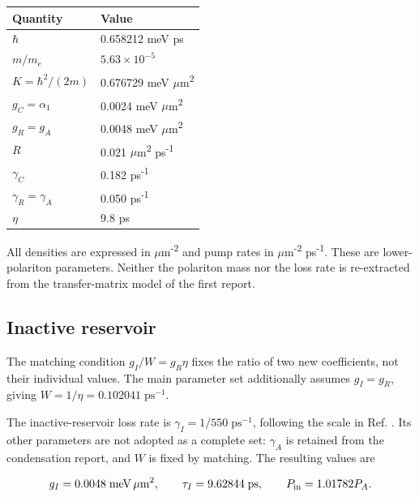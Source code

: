 \documentclass[12pt,a4paper]{article}
\begin{document}
\begingroup\small\setlength{\tabcolsep}{5pt}\renewcommand{\arraystretch}{1.2}
\begin{longtable}{@{}p{}p{}@{}}
\toprule
Quantity & Value\\
\midrule
\(\hbar\) & 0.658212 meV ps\\
\(m/m_e\) & \(5.63\times10^{-5}\)\\
\(K=\hbar^2/(2m)\) & 0.676729 meV \ensuremath{\mu}m\textsuperscript{2}\\
\(g_C=\alpha_1\) & 0.0024 meV \ensuremath{\mu}m\textsuperscript{2}\\
\(g_R=g_A\) & 0.0048 meV \ensuremath{\mu}m\textsuperscript{2}\\
\(R\) & 0.021 \ensuremath{\mu}m\textsuperscript{2} ps\textsuperscript{-}\textsuperscript{1}\\
\(\gamma_C\) & 0.182 ps\textsuperscript{-}\textsuperscript{1}\\
\(\gamma_R=\gamma_A\) & 0.050 ps\textsuperscript{-}\textsuperscript{1}\\
\(\eta\) & 9.8 ps\\
\bottomrule
\end{longtable}
\endgroup

All densities are expressed in \ensuremath{\mu}m\textsuperscript{-}\textsuperscript{2} and pump rates in \ensuremath{\mu}m\textsuperscript{-}\textsuperscript{2} ps\textsuperscript{-}\textsuperscript{1}. These are lower-polariton parameters. Neither the polariton mass nor the loss rate is re-extracted from the transfer-matrix model of the first report.

\subsection{Inactive reservoir}

The matching condition \(g_I/W=g_R\eta\) fixes the ratio of two new coefficients, not their individual values. The main parameter set additionally assumes \(g_I=g_R\), giving \(W=1/\eta=0.102041\;\mathrm{ps}^{-1}\).

The inactive-reservoir loss rate is \(\gamma_I=1/550\;\mathrm{ps}^{-1}\), following the scale in Ref. \cite{ref2}. Its other parameters are not adopted as a complete set: \(\gamma_A\) is retained from the condensation report, and \(W\) is fixed by matching. The resulting values are

\[
g_I=0.0048\;\mathrm{meV}\,\mu\mathrm m^2,\qquad
\tau_I=9.62844\;\mathrm{ps},\qquad P_{\rm in}=1.01782P_A.
\]
\end{document}
